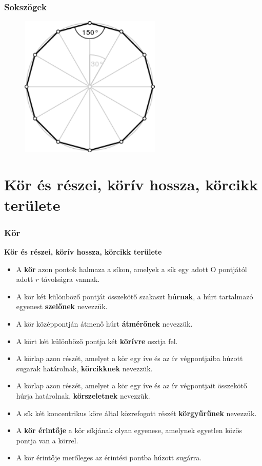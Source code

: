 \documentclass[11pt]{beamer}
\begin{document}
\begin{frame}
\frametitle{Sokszögek}
\begin{figure}
  \includegraphics[width=0.6\textwidth]{dodecagon.png}
\end{figure}
\end{frame}

\section{\textbf{Kör és részei, körív hossza, körcikk területe}}
\begin{frame}[<+->]
\frametitle{Kör}
\begin{block}{\textbf{Kör és részei, körív hossza, körcikk területe}}
\begin{itemize}[label=$\circ$]
\item A \textbf{kör} azon pontok halmaza a síkon, amelyek a sík egy adott O pontjától adott $r$ távolságra vannak.
\item A kör két különböző pontját összekötő szakaszt \textbf{húrnak}, a húrt tartalmazó egyenest \textbf{szelőnek} nevezzük.
\item A kör középpontján átmenő húrt \textbf{átmérőnek} nevezzük.
\item A kört két különböző pontja két \textbf{körívre} osztja fel.
\item A körlap azon részét, amelyet a kör egy íve és az ív végpontjaiba húzott sugarak határolnak, \textbf{körcikknek} nevezzük.
\item A körlap azon részét, amelyet a kör egy íve és az ív végpontjait összekötő húrja határolnak, \textbf{körszeletnek} nevezzük.
\item A sík két koncentrikus köre által közrefogott részét \textbf{körgyűrűnek} nevezzük.
\item A \textbf{kör érintője} a kör síkjának olyan egyenese, amelynek egyetlen közös pontja van a körrel.
\item A kör érintője merőleges az érintési pontba húzott sugárra.
\end{itemize}
\end{block}
\end{frame}
\end{document}
